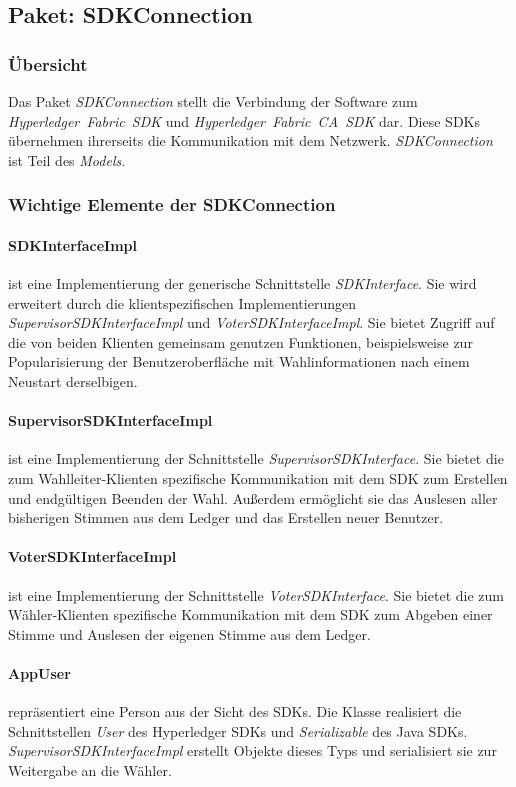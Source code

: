 \documentclass[parskip=full]{scrartcl}
\newcommand{\textitx}[1]{\mbox{\textit{#1}}}
\begin{document}
	\subsection{Paket: SDKConnection}
	\subsubsection{Übersicht}
	Das Paket \textitx{SDKConnection} stellt die Verbindung der Software zum \textitx{Hyperledger Fabric SDK} und \textitx{Hyperledger Fabric CA SDK} dar. Diese SDKs übernehmen ihrerseits die Kommunikation mit dem Netzwerk. \textitx{SDKConnection} ist Teil des \textitx{Models}.
	\subsubsection{Wichtige Elemente der SDKConnection}
	\paragraph{SDKInterfaceImpl} ist eine Implementierung der generische Schnittstelle \textitx{SDKInterface}. Sie wird erweitert durch die klientspezifischen Implementierungen \textit{SupervisorSDKInterfaceImpl} und \textit{VoterSDKInterfaceImpl}. Sie bietet Zugriff auf die von beiden Klienten gemeinsam genutzen Funktionen, beispielsweise zur Popularisierung der Benutzeroberfläche mit Wahlinformationen nach einem Neustart derselbigen.
	\paragraph{SupervisorSDKInterfaceImpl} ist eine Implementierung der Schnittstelle \textit{SupervisorSDKInterface}. Sie bietet die zum Wahlleiter-Klienten spezifische Kommunikation mit dem SDK zum Erstellen und endgültigen Beenden der Wahl. Außerdem ermöglicht sie das Auslesen aller bisherigen Stimmen aus dem Ledger und das Erstellen neuer Benutzer.
	\paragraph{VoterSDKInterfaceImpl} ist eine Implementierung der Schnittstelle \textit{VoterSDKInterface}. Sie bietet die zum Wähler-Klienten spezifische Kommunikation mit dem SDK zum Abgeben einer Stimme und Auslesen der eigenen Stimme aus dem Ledger.
	\paragraph{AppUser} repräsentiert eine Person aus der Sicht des SDKs. Die Klasse realisiert die Schnittstellen \textitx{User} des Hyperledger SDKs und \textitx{Serializable} des Java SDKs. \textit{SupervisorSDKInterfaceImpl} erstellt Objekte dieses Typs und serialisiert sie zur Weitergabe an die Wähler.
\end{document}
